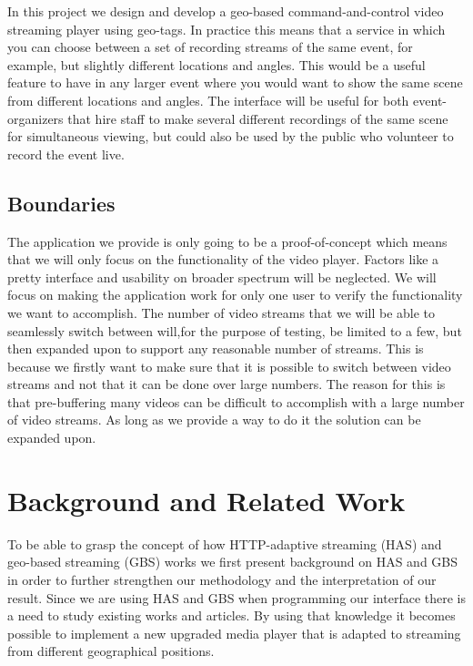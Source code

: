 \documentclass[9pt,a4paper]{acmproc}
\begin{document}
In this project we design and develop a geo-based command-and-control video streaming player using geo-tags. In practice this means that a service in which you can choose between a set of recording streams of the same event, for example, but slightly different locations and angles. This would be a useful feature to have in any larger event where you would want to show the same scene from different locations and angles. The interface will be useful for both event-organizers that hire staff to make several different recordings of the same scene for simultaneous viewing, but could also be used by the public who volunteer to record the event live.

\subsection{Boundaries}
The application we provide is only going to be a proof-of-concept which means that we will only focus on the functionality of the video player. Factors like a pretty interface and usability on broader spectrum will be neglected. We will focus on making the application work for only one user to verify the functionality we want to accomplish. The number of video streams that we will be able to seamlessly switch between will,for the purpose of testing, be limited to a few, but then expanded upon to support any reasonable number of streams. This is because we firstly want to make sure that it is possible to switch between video streams and not that it can be done over large numbers. The reason for this is that pre-buffering many videos can be difficult to accomplish with a large number of video streams. As long as we provide a way to do it the solution can be expanded upon.


\section{Background and Related Work}
To be able to grasp the concept of how HTTP-adaptive streaming (HAS) and geo-based streaming (GBS) works we first present background on HAS and GBS in order to further strengthen our methodology and the interpretation of our result. Since we are using HAS and GBS when programming our interface there is a need to study existing works and articles. By using that knowledge it becomes possible to implement a new upgraded media player that is adapted to streaming from different geographical positions.
\end{document}
